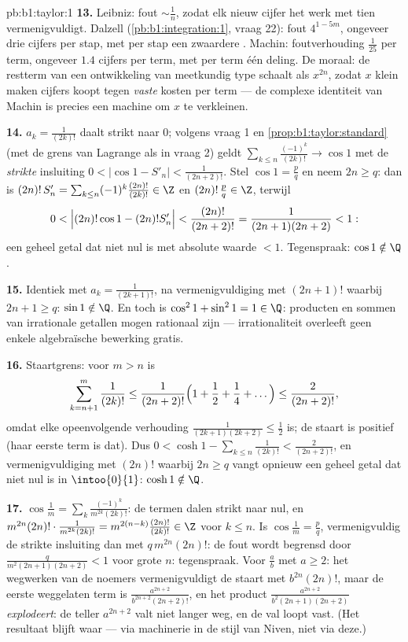 \begin{solution}{pb:b1:taylor:1}
\textbf{13.} Leibniz: fout $\sim \frac1n$, zodat elk nieuw
cijfer het werk met tien vermenigvuldigt. Dalzell
(\cref{pb:b1:integration:1}, vraag 22): fout $4^{1-5m}$,
ongeveer drie cijfers per stap, met per stap een zwaardere
. Machin: foutverhouding $\frac{1}{25}$ per term,
ongeveer $1.4$ cijfers per term, met per term één deling. De
moraal: de restterm van een ontwikkeling van meetkundig type
schaalt als $x^{2n}$, zodat $x$ klein maken cijfers koopt tegen
\emph{vaste} kosten per term --- de complexe identiteit van
Machin is precies een machine om $x$ te verkleinen.

\textbf{14.} $a_k = \frac{1}{(2k)!}$ daalt strikt naar $0$;
volgens vraag 1 en \cref{prop:b1:taylor:standard} (met de grens
van Lagrange als in vraag 2) geldt $\sum_{k \leq
n}\frac{(-1)^k}{(2k)!} \to \cos 1$ met de \emph{strikte}
insluiting $0 < \bigl|\cos 1 - S'_n\bigr| < \frac{1}{(2n+2)!}$.
Stel $\cos 1 = \frac pq$ en neem $2n \geq q$: dan is
$(2n)!\,S'_n = \sum_{k\leq n} (-1)^k \frac{(2n)!}{(2k)!} \in \Z$
en $(2n)!\,\frac pq \in \Z$, terwijl
\[
0 < \Bigl|(2n)!\cos 1 - (2n)!S'_n\Bigr| <
\frac{(2n)!}{(2n+2)!} = \frac{1}{(2n+1)(2n+2)} < 1 :
\]
een geheel getal dat niet nul is met absolute waarde $< 1$.
Tegenspraak: $\cos 1 \notin \Q$.

\textbf{15.} Identiek met $a_k = \frac{1}{(2k+1)!}$, na
vermenigvuldiging met $(2n+1)!$ waarbij $2n + 1 \geq q$: $\sin 1
\notin \Q$. En toch is $\cos^2 1 + \sin^2 1 = 1 \in \Q$:
producten en sommen van irrationale getallen mogen rationaal
zijn --- irrationaliteit overleeft geen enkele algebraïsche
bewerking gratis.

\textbf{16.} Staartgrens: voor $m > n$ is
\[
\sum_{k=n+1}^{m} \frac{1}{(2k)!}
\leq \frac{1}{(2n+2)!}\Bigl(1 + \frac12 + \frac14 +
\dots\Bigr) \leq \frac{2}{(2n+2)!} ,
\]
omdat elke opeenvolgende verhouding $\frac{1}{(2k+1)(2k+2)} \leq
\frac12$ is; de staart is positief (haar eerste term is dat).
Dus $0 < \cosh 1 - \sum_{k\leq n}\frac{1}{(2k)!} <
\frac{2}{(2n+2)!}$, en vermenigvuldiging met $(2n)!$ waarbij $2n
\geq q$ vangt opnieuw een geheel getal dat niet nul is in
$\intoo{0}{1}$: $\cosh 1 \notin \Q$.

\textbf{17.} $\cos\frac1m = \sum_k \frac{(-1)^k}{m^{2k}(2k)!}$:
de termen dalen strikt naar nul, en $m^{2n}(2n)!\cdot
\frac{1}{m^{2k}(2k)!} = m^{2(n-k)}\frac{(2n)!}{(2k)!} \in \Z$
voor $k \leq n$. Is $\cos\frac1m = \frac pq$, vermenigvuldig de
strikte insluiting dan met $q\,m^{2n}(2n)!$: de fout wordt
begrensd door $\frac{q}{m^2(2n+1)(2n+2)} < 1$ voor grote $n$:
tegenspraak. Voor $\frac ab$ met $a \geq 2$: het wegwerken van
de noemers vermenigvuldigt de staart met $b^{2n}(2n)!$, maar de
eerste weggelaten term is $\frac{a^{2n+2}}{b^{2n+2}(2n+2)!}$, en
het product $\frac{a^{2n+2}}{b^2(2n+1)(2n+2)}$ \emph{explodeert}:
de teller $a^{2n+2}$ valt niet langer weg, en de val loopt vast.
(Het resultaat blijft waar --- via machinerie in de stijl van
Niven, niet via deze.)


\end{solution}
